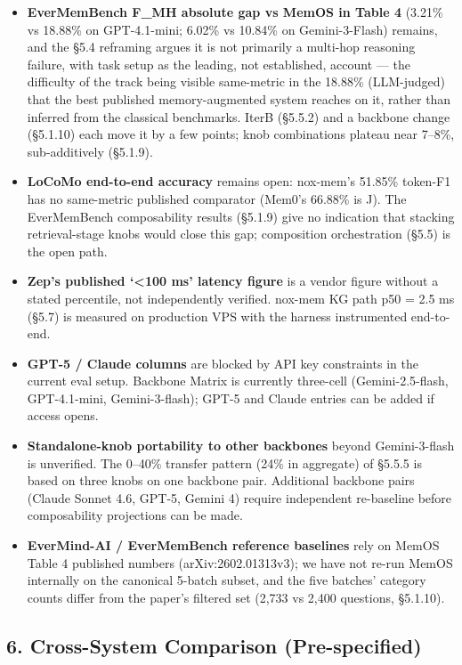 \documentclass[
]{article}
\providecommand{\tightlist}{%
  \setlength{\itemsep}{0pt}\setlength{\parskip}{0pt}}
\begin{document}
\begin{itemize}
\tightlist
\item
  \textbf{EverMemBench F\_MH absolute gap vs MemOS in Table 4} (3.21\%
  vs 18.88\% on GPT-4.1-mini; 6.02\% vs 10.84\% on Gemini-3-Flash)
  remains, and the §5.4 reframing argues it is not primarily a multi-hop
  reasoning failure, with task setup as the leading, not established,
  account --- the difficulty of the track being visible same-metric in
  the 18.88\% (LLM-judged) that the best published memory-augmented
  system reaches on it, rather than inferred from the classical
  benchmarks. IterB (§5.5.2) and a backbone change (§5.1.10) each move
  it by a few points; knob combinations plateau near 7--8\%,
  sub-additively (§5.1.9).
\item
  \textbf{LoCoMo end-to-end accuracy} remains open: nox-mem's 51.85\%
  token-F1 has no same-metric published comparator (Mem0's 66.88\% is
  J). The EverMemBench composability results (§5.1.9) give no indication
  that stacking retrieval-stage knobs would close this gap; composition
  orchestration (§5.5) is the open path.
\item
  \textbf{Zep's published `\textless100 ms' latency figure} is a vendor
  figure without a stated percentile, not independently verified.
  nox-mem KG path p50 = 2.5 ms (§5.7) is measured on production VPS with
  the harness instrumented end-to-end.
\item
  \textbf{GPT-5 / Claude columns} are blocked by API key constraints in
  the current eval setup. Backbone Matrix is currently three-cell
  (Gemini-2.5-flash, GPT-4.1-mini, Gemini-3-flash); GPT-5 and Claude
  entries can be added if access opens.
\item
  \textbf{Standalone-knob portability to other backbones} beyond
  Gemini-3-flash is unverified. The 0--40\% transfer pattern (24\% in
  aggregate) of §5.5.5 is based on three knobs on one backbone pair.
  Additional backbone pairs (Claude Sonnet 4.6, GPT-5, Gemini 4) require
  independent re-baseline before composability projections can be made.
\item
  \textbf{EverMind-AI / EverMemBench reference baselines} rely on MemOS
  Table 4 published numbers (arXiv:2602.01313v3); we have not re-run
  MemOS internally on the canonical 5-batch subset, and the five
  batches' category counts differ from the paper's filtered set (2,733
  vs 2,400 questions, §5.1.10).
\end{itemize}

\subsection{6. Cross-System Comparison
(Pre-specified)}\label{cross-system-comparison-pre-specified}
\end{document}
